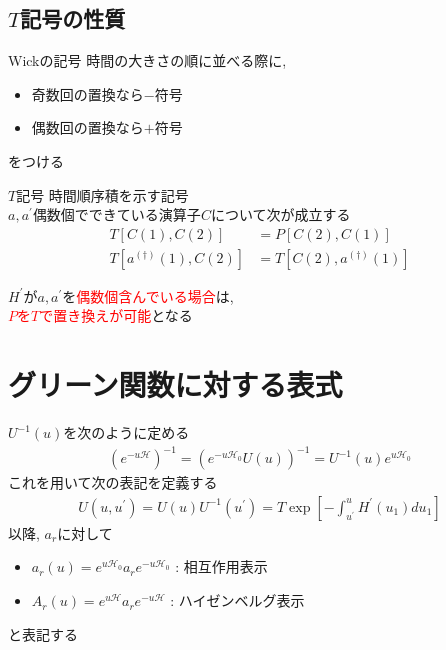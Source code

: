 \documentclass[dvipdfmx,11pt]{beamer}
\begin{document}
\subsection{$T$記号の性質}
\begin{frame}
    \begin{block}{Wickの記号}
        時間の大きさの順に並べる際に, 
        \begin{itemize}
            \centering
            \item 奇数回の置換なら$-$符号
            \item 偶数回の置換なら$+$符号
        \end{itemize}
        をつける
    \end{block}
    \begin{block}{$T$記号}
        時間順序積を示す記号\\
        $a,a^{'}$偶数個でできている演算子$C$について次が成立する
        \begin{align}
            T[C(1),C(2)] &= P[C(2),C(1)] \tag{16} \\
            T[a^{(\dagger)}(1),C(2)] &= T[C(2),a^{(\dagger)}(1)] \tag{17}
        \end{align}
    \end{block}
    \centering
    $H^{'}$が$a,a^{'}$を\textcolor{red}{偶数個含んでいる場合}は,\\ \textcolor{red}{$P$を$T$で置き換えが可能}となる
\end{frame}


\section{グリーン関数に対する表式}
\begin{frame}
    $U^{-1}(u)$を次のように定める
    \begin{align}
        \left(e^{-u\mathscr{H}}\right)^{-1} = \left(e^{-u\mathscr{H}_0}U(u)\right)^{-1} = U^{-1}(u)e^{u\mathscr{H}_0} \tag{18}
    \end{align}
    これを用いて次の表記を定義する
    \begin{align}
        U(u,u^{'})=U(u)U^{-1}(u^{'}) = T\exp\left[-\int_{u^{'}}^uH^{'}(u_1)du_1\right] \tag{24}
    \end{align}
    以降, $a_r$に対して
    \begin{itemize}
        \item $a_r(u) = e^{u\mathscr{H}_0}a_re^{-u\mathscr{H}_0}$ : 相互作用表示
        \item $A_r(u) = e^{u\mathscr{H}}a_re^{-u\mathscr{H}}$ : ハイゼンベルグ表示
    \end{itemize}
    と表記する
\end{frame}
\end{document}
